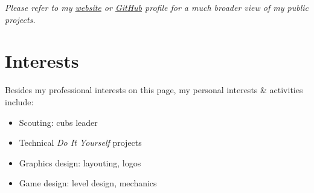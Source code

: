 \documentclass[]{cv-timvisee}
\providecommand{\tightlist}{%
\setlength{\itemsep}{0pt}\setlength{\parskip}{0pt}}
\begin{document}
\emph{Please refer to my
\href{https://timvisee.com/projects}{website} or
\href{https://github.com/timvisee}{GitHub}
profile for a much broader view of my public projects.}


\section{Interests}

Besides my professional interests on this page, my personal interests \&
activities include:

{\setlength\multicolsep{3pt}%
\begin{multicols}{2}
\begin{itemize}
  \tightlist{}
  \item Scouting: cubs leader
  \item Technical \emph{Do It Yourself} projects
  \item Graphics design: layouting, logos
  \item Game design: level design, mechanics
\end{itemize}
\end{multicols}}
\end{document}
